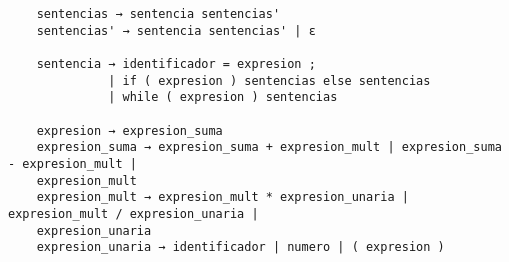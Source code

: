 \documentclass{article}
\begin{document}
\begin{enumerate}
\begin{verbatim}
    sentencias → sentencia sentencias'
    sentencias' → sentencia sentencias' | ε

    sentencia → identificador = expresion ;
              | if ( expresion ) sentencias else sentencias
              | while ( expresion ) sentencias

    expresion → expresion_suma
    expresion_suma → expresion_suma + expresion_mult | expresion_suma - expresion_mult | 
    expresion_mult 
    expresion_mult → expresion_mult * expresion_unaria | expresion_mult / expresion_unaria | 
    expresion_unaria
    expresion_unaria → identificador | numero | ( expresion )
    \end{verbatim}
    
\end{enumerate}
\end{document}
